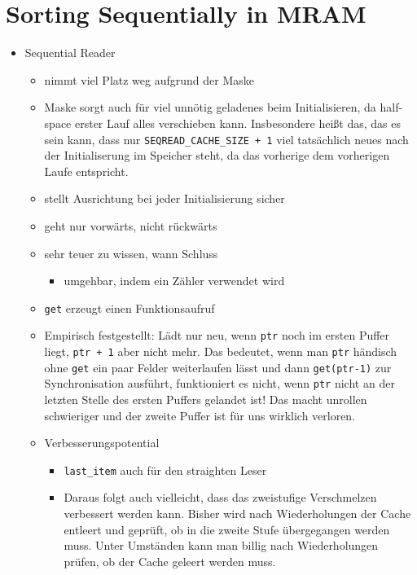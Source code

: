 \chapter{Sorting Sequentially in MRAM}
\label{sec:mram}

\begin{itemize}
	\item
	Sequential Reader
	\begin{itemize}
		\item
		nimmt viel Platz weg aufgrund der Maske

		\item
		Maske sorgt auch für viel unnötig geladenes beim Initialisieren, da half-space \MS{} erster Lauf alles verschieben kann.
		Insbesondere heißt das, das es sein kann, dass nur \lstinline|SEQREAD_CACHE_SIZE + 1| viel tatsächlich neues nach der Initialiserung im Speicher steht, da das vorherige dem vorherigen Laufe entspricht.

		\item
		stellt Ausrichtung bei jeder Initialisierung sicher

		\item
		geht nur vorwärts, nicht rückwärts

		\item
		sehr teuer zu wissen, wann Schluss
		\begin{itemize}
			\item
			umgehbar, indem ein Zähler verwendet wird
		\end{itemize}

		\item
		\lstinline|get| erzeugt einen Funktionsaufruf

		\item
		Empirisch festgestellt:
		Lädt nur neu, wenn \lstinline|ptr| noch im ersten Puffer liegt, \lstinline|ptr + 1| aber nicht mehr.
		Das bedeutet, wenn man \lstinline|ptr| händisch ohne \lstinline|get| ein paar Felder weiterlaufen lässt und dann \lstinline|get(ptr-1)| zur Synchronisation ausführt, funktioniert es nicht, wenn \lstinline|ptr| nicht an der letzten Stelle des ersten Puffers gelandet ist!
		Das macht unrollen schwieriger und der zweite Puffer ist für uns wirklich verloren.

		\item
		Verbesserungspotential
		\begin{itemize}
			\item
			\lstinline|last_item| auch für den straighten Leser

			\item
			Daraus folgt auch vielleicht, dass das zweistufige Verschmelzen verbessert werden kann.
			Bisher wird nach \unrolledcachelength{} Wiederholungen der Cache entleert und geprüft, ob in die zweite Stufe übergegangen werden muss.
			Unter Umständen kann man billig nach \unrollfactor{} Wiederholungen prüfen, ob der Cache geleert werden muss.
		\end{itemize}
	\end{itemize}


\end{itemize}
